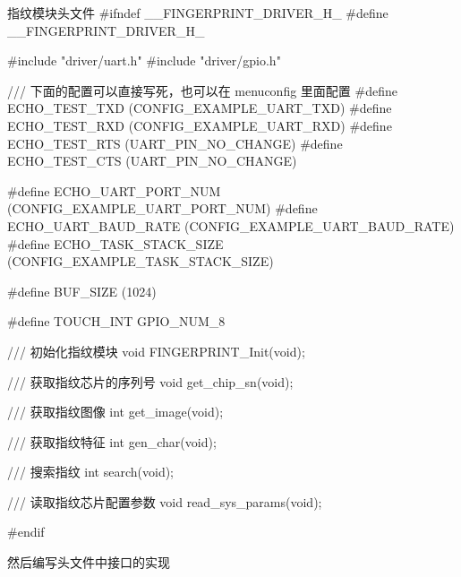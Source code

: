 \documentclass[lang=cn,newtx,10pt,scheme=chinese]{elegantbook}
\begin{document}
\begin{mycode}{指纹模块头文件}
#ifndef __FINGERPRINT_DRIVER_H_
#define __FINGERPRINT_DRIVER_H_

#include "driver/uart.h"
#include "driver/gpio.h"

/// 下面的配置可以直接写死，也可以在 menuconfig 里面配置
#define ECHO_TEST_TXD (CONFIG_EXAMPLE_UART_TXD)
#define ECHO_TEST_RXD (CONFIG_EXAMPLE_UART_RXD)
#define ECHO_TEST_RTS (UART_PIN_NO_CHANGE)
#define ECHO_TEST_CTS (UART_PIN_NO_CHANGE)

#define ECHO_UART_PORT_NUM (CONFIG_EXAMPLE_UART_PORT_NUM)
#define ECHO_UART_BAUD_RATE (CONFIG_EXAMPLE_UART_BAUD_RATE)
#define ECHO_TASK_STACK_SIZE (CONFIG_EXAMPLE_TASK_STACK_SIZE)

#define BUF_SIZE (1024)

#define TOUCH_INT GPIO_NUM_8

/// 初始化指纹模块
void FINGERPRINT_Init(void);

/// 获取指纹芯片的序列号
void get_chip_sn(void);

/// 获取指纹图像
int get_image(void);

/// 获取指纹特征
int gen_char(void);

/// 搜索指纹
int search(void);

/// 读取指纹芯片配置参数
void read_sys_params(void);

#endif
\end{mycode}

然后编写头文件中接口的实现
\end{document}
